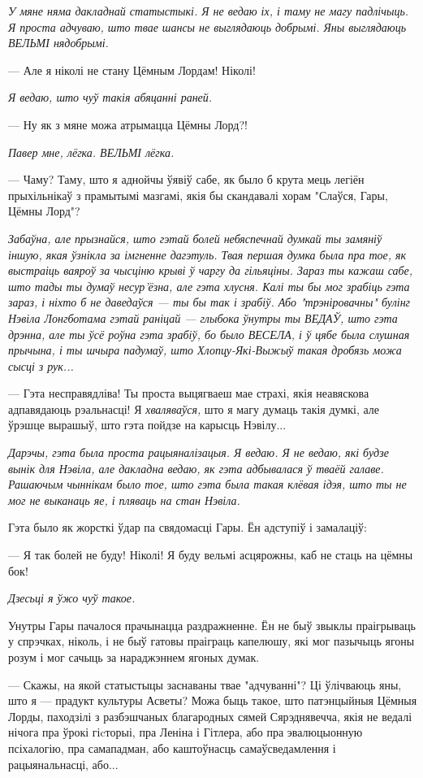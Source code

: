 \emph{У мяне няма дакладнай статыстыкі. Я не ведаю іх, і таму не магу падлічыць.
Я проста адчуваю, што твае шансы не выглядаюць добрымі. Яны выглядаюць ВЕЛЬМІ нядобрымі.}

--- Але я ніколі не стану Цёмным Лордам! Ніколі!

\emph{Я ведаю, што чуў такія абяцанні раней.}

--- Ну як з мяне можа атрымацца Цёмны Лорд?!

\emph{Павер мне, лёгка. ВЕЛЬМІ лёгка.}

--- Чаму? Таму, што я аднойчы ўявіў сабе, як было б крута мець 
легіён прыхільнікаў з прамытымі мазгамі, якія бы скандавалі хорам "Слаўся, Гары, Цёмны Лорд"?

\emph{Забаўна, але прызнайся, што гэтай болей небяспечнай думкай ты замяніў іншую, якая
ўзнікла за імгненне дагэтуль. Твая першая думка была пра тое, як выстраіць ваяроў за 
чысціню крыві ў чаргу да гільяціны. Зараз ты кажаш сабе, што тады ты думаў несур'ёзна,
але гэта хлусня. Калі ты бы мог зрабіць гэта зараз, і ніхто б не даведаўся --- ты бы так і 
зрабіў. Або "трэніровачны" булінг Нэвіла Лонгботама гэтай раніцай --- глыбока ўнутры ты 
ВЕДАЎ, што гэта дрэнна, але ты ўсё роўна гэта зрабіў, бо было ВЕСЕЛА, і ў цябе 
была слушная прычына, і ты шчыра падумаў, што Хлопцу-Які-Выжыў такая дробязь можа
сысці з рук...}

---  Гэта несправядліва! Ты проста выцягваеш мае страхі, якія неавяскова 
адпавядаюць рэальнасці! Я \emph{хваляваўся,} што я магу думаць такія думкі, але ўрэшце
вырашыў, што гэта пойдзе на карысць Нэвілу...

\emph{Дарэчы, гэта была проста рацыяналізацыя. Я ведаю. Я не ведаю, які будзе
вынік для Нэвіла, але дакладна ведаю, як гэта адбывалася ў тваёй галаве.
Рашаючым чыннікам было тое, што гэта была такая клёвая ідэя, што ты не мог 
не выканаць яе, і пляваць на стан Нэвіла.}

Гэта было як жорсткі ўдар па свядомасці Гары. Ён адступіў і замалаціў:

--- Я так болей не буду! Ніколі! Я буду вельмі асцярожны, каб не стаць на цёмны бок!

\emph{Дзесьці я ўжо чуў такое.}

Унутры Гары пачалося прачынацца раздражненне. Ён не быў звыклы праігрываць у 
спрэчках, ніколь, і не быў гатовы праіграць капелюшу, які мог пазычыць ягоны розум
і мог сачыць за нараджэннем ягоных думак. 

--- Скажы, на якой статыстыцы заснаваны твае "адчуванні"? Ці ўлічваюць яны,
што я --- прадукт культуры Асветы? Можа быць такое, што патэнцыйныя Цёмныя Лорды,
паходзілі з разбэшчаных благародных сямей Сярэднявечча, якія не ведалі нічога пра
ўрокі гіcторыі, пра Леніна і Гітлера, або пра эвалюцыонную псіхалогію, пра самападман,
або каштоўнасць самаўсведамлення і рацыянальнасці, або...

